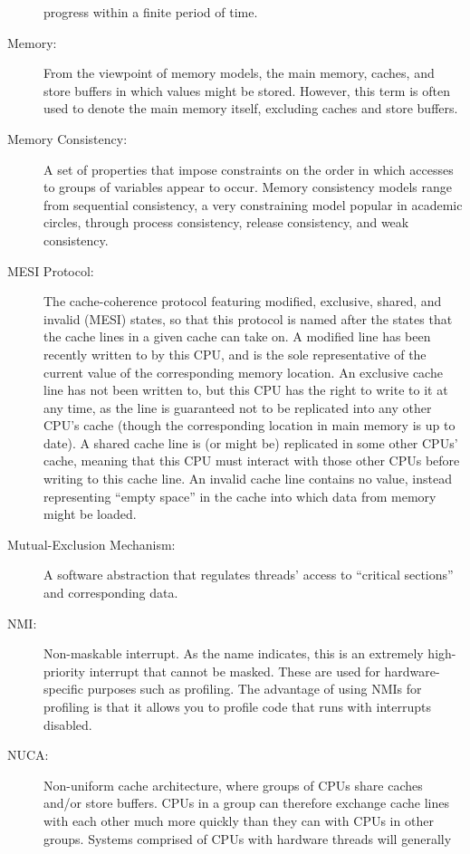 \begin{description}
	progress within a finite period of time.
\item[Memory:]
	From the viewpoint of memory models, the main memory,
	caches, and store buffers in which values might be stored.
	However, this term is often used to denote the main memory
	itself, excluding caches and store buffers.
\item[Memory Consistency:]
	A set of properties that impose constraints on the order in
	which accesses to groups of variables appear to occur.
	Memory consistency models range from sequential consistency,
	a very constraining model popular in academic circles, through
	process consistency, release consistency, and weak consistency.
\item[MESI Protocol:]
	The
	cache-coherence protocol featuring
	modified, exclusive, shared, and invalid (MESI) states,
	so that this protocol is named after the states that the
	cache lines in a given cache can take on.
	A modified line has been recently written to by this CPU,
	and is the sole representative of the current value of
	the corresponding memory location.
	An exclusive cache line has not been written to, but this
	CPU has the right to write to it at any time, as the line
	is guaranteed not to be replicated into any other CPU's cache
	(though the corresponding location in main memory is up to date).
	A shared cache line is (or might be) replicated in some other
	CPUs' cache, meaning that this CPU must interact with those other
	CPUs before writing to this cache line.
	An invalid cache line contains no value, instead representing
	``empty space'' in the cache into which data from memory might
	be loaded.
\item[Mutual-Exclusion Mechanism:]
	A software abstraction that regulates threads' access to
	``critical sections'' and corresponding data.
\item[NMI:]
	Non-maskable interrupt.
	As the name indicates, this is an extremely high-priority
	interrupt that cannot be masked.
	These are used for hardware-specific purposes such as profiling.
	The advantage of using NMIs for profiling is that it allows you
	to profile code that runs with interrupts disabled.
\item[NUCA:]
	Non-uniform cache architecture, where groups of CPUs share
	caches and/or store buffers.
	CPUs in a group can therefore exchange cache lines with each
	other much more quickly than they can with CPUs in other groups.
	Systems comprised of CPUs with hardware threads will generally

\end{description}
